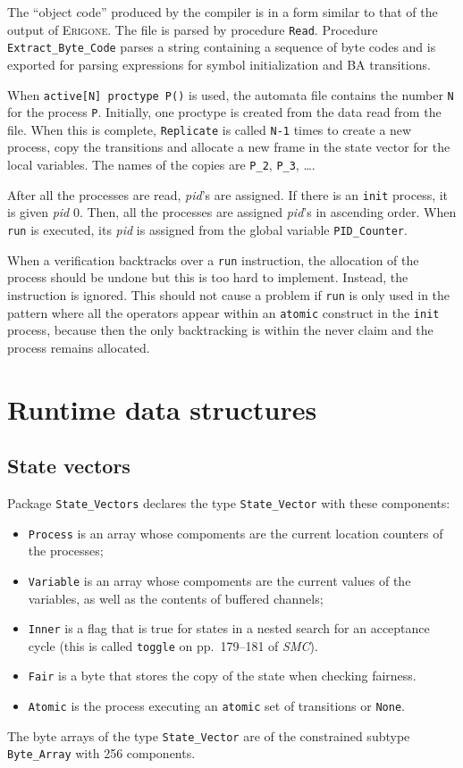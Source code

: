 \documentclass[11pt]{article}
\newcommand*{\prg}{\textsc{Erigone}}
\newcommand*{\smc}{\textit{SMC}}
\newcommand*{\p}[1]{\texttt{#1}}
\begin{document}
The ``object code'' produced by the compiler is in a form similar to
that of the output of \prg{}. The file is parsed by procedure \p{Read}.
Procedure \p{Extract\_Byte\_Code} parses a string containing a sequence
of byte codes and is exported for parsing expressions for symbol
initialization and BA transitions.

When \p{active[N] proctype P()} is used, the automata file contains the
number \p{N} for the process \p{P}. Initially, one proctype is created
from the data read from the file. When this is complete, \p{Replicate}
is called \p{N-1} times to create a new process, copy the
transitions and allocate a new frame in the state vector for the local
variables. The names of the copies are \p{P\_2}, \p{P\_3}, \ldots.

After all the processes are read, \emph{pid}'s are assigned. If there is
an \p{init} process, it is given \emph{pid} 0. Then, all the processes
are assigned \emph{pid}'s in ascending order. When \p{run} is executed,
its \emph{pid} is assigned from the global variable \p{PID\_Counter}.

When a verification backtracks over a \p{run} instruction, the
allocation of the process should be undone but this is too hard to
implement. Instead, the instruction is ignored. This should not cause a
problem if \p{run} is only used in the pattern where all the operators
appear within an \p{atomic} construct in the \p{init} process, because
then the only backtracking is within the never claim and the process
remains allocated.

\section{Runtime data structures}

\subsection{State vectors}
Package \p{State\_Vectors} declares the type \p{State\_Vector} with these
components:
\begin{itemize}
\item \p{Process} is an array whose compoments are the current location
counters of the processes;
\item \p{Variable} is an array whose compoments are the current values of
the variables, as well as the contents of buffered channels;
\item \p{Inner} is a flag that is true for states in a nested search for
an acceptance cycle (this is called \p{toggle} on pp.~179--181 of
\smc{}).
\item \p{Fair} is a byte that stores the copy of the state when checking fairness.
\item \p{Atomic} is the process executing an \p{atomic} set of transitions or \p{None}.
\end{itemize}
The byte arrays of the type \p{State\_Vector} are of the constrained
subtype \p{Byte\_Array} with 256 components.
\end{document}

